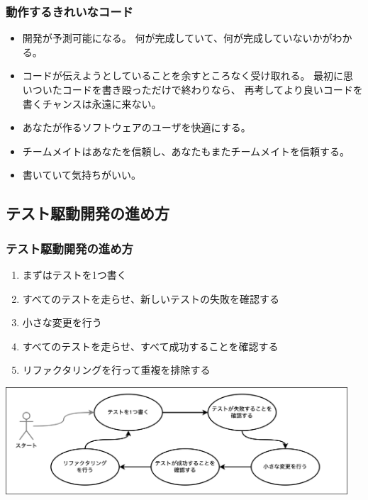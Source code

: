 \documentclass[aspectratio=169]{beamer}
\begin{document}
\begin{frame}[fragile]\frametitle{動作するきれいなコード}
  \begin{itemize}
    \item {\color{blue} 開発が予測可能になる。}
      何が完成していて、何が完成していないかがわかる。
    \item {\color{blue} コードが伝えようとしていることを余すところなく受け取れる。}
      最初に思いついたコードを書き殴っただけで終わりなら、
      再考してより良いコードを書くチャンスは永遠に来ない。

    \large \color{blue}
    \item あなたが作るソフトウェアのユーザを快適にする。
    \item チームメイトはあなたを信頼し、あなたもまたチームメイトを信頼する。
    \item 書いていて気持ちがいい。
  \end{itemize}
\end{frame}

\subsection{テスト駆動開発の進め方}
\begin{frame}\frametitle{テスト駆動開発の進め方}
  \begin{enumerate}
    \item まずはテストを1つ書く
    \item すべてのテストを走らせ、新しいテストの失敗を確認する
    \item 小さな変更を行う
    \item すべてのテストを走らせ、すべて成功することを確認する
    \item リファクタリングを行って重複を排除する
  \end{enumerate}

  \begin{center}
    \includegraphics[height=4cm]{asset/tdd_cycle.png}
  \end{center}
\end{frame}
\end{document}
